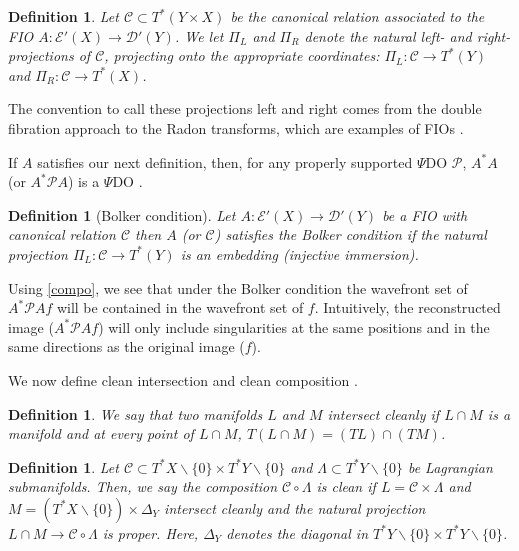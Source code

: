 \documentclass[11pt]{article}
\numberwithin{equation}{section}
\newcommand{\Cc}{\mathcal{C}}
\newcommand{\Dc}{\mathcal{D}}
\newcommand{\Ec}{\mathcal{E}}
\newtheorem{definition}[theorem]{Definition}
\theoremstyle{definition}
\begin{document}
\begin{definition}
\label{defproj} Let $\Cc\subset T^*(Y\times X)$ be the canonical relation associated to the FIO ${A}:\mathcal{E}'(X)\to \mathcal{D}'(Y)$. We let $\Pi_L$ and $\Pi_R$ denote the natural left- and right-projections of $\Cc$, projecting onto the appropriate coordinates: $\Pi_L:\Cc\to T^*(Y)$ and $\Pi_R : \Cc\to T^*(X)$.
\end{definition}

The convention to call these projections left and right comes from the double fibration approach to the  Radon transforms, which are examples of FIOs \cite[Section 4]{gruhl1}.

If $A$ satisfies our next definition, then, for any properly supported $\Psi$DO $\mathcal{P}$, $A^* A$ (or $A^* \mathcal{P} A$) is a $\Psi$DO \cite{GS1977, quinto}.

\begin{definition}[Bolker condition]\label{def:bolker} 
Let ${A}:\Ec'(X)\to \Dc'(Y)$ be a FIO with canonical relation $\Cc$ then {$A$} (or $\Cc$) satisfies the Bolker condition if the natural projection $\Pi_L:\Cc\to T^*(Y)$ is an embedding (injective immersion).
\end{definition}

Using \eqref{compo}, we see that under the Bolker condition the wavefront set of $A^* \mathcal{P} Af$ will be contained in the wavefront set of $f$. Intuitively, the reconstructed image ($A^* \mathcal{P} Af$) will only include singularities at the same positions and in the same directions as the original image ($f$). 

We now define clean intersection \cite[Definition C.3.2]{hor3} and clean composition \cite[Definition 5.2, Chapter VIII]{trev2}.

\begin{definition}\label{def:clean int}
We say that two manifolds $L$ and $M$ intersect cleanly if $L\cap M$ is a manifold and at every point of $L\cap M$, $T(L\cap M) = (TL)\cap(TM)$.
\end{definition}

\begin{definition}\label{def:clean comp}
Let $\Cc \subset T^*X\backslash \{0\} \times T^*Y\backslash \{0\}$ and $\Lambda \subset T^*Y\backslash \{0\}$ be Lagrangian submanifolds. Then, we say the composition $\Cc \circ \Lambda$ is clean if $L = \Cc \times \Lambda$ and $M = (T^*X\backslash \{0\}) \times \Delta_Y$ intersect cleanly and the natural projection $L\cap M \to \Cc \circ \Lambda$ is proper. Here, $\Delta_Y$ denotes the diagonal in $T^*Y\backslash \{0\} \times T^*Y\backslash \{0\}$.
\end{definition}
\end{document}
